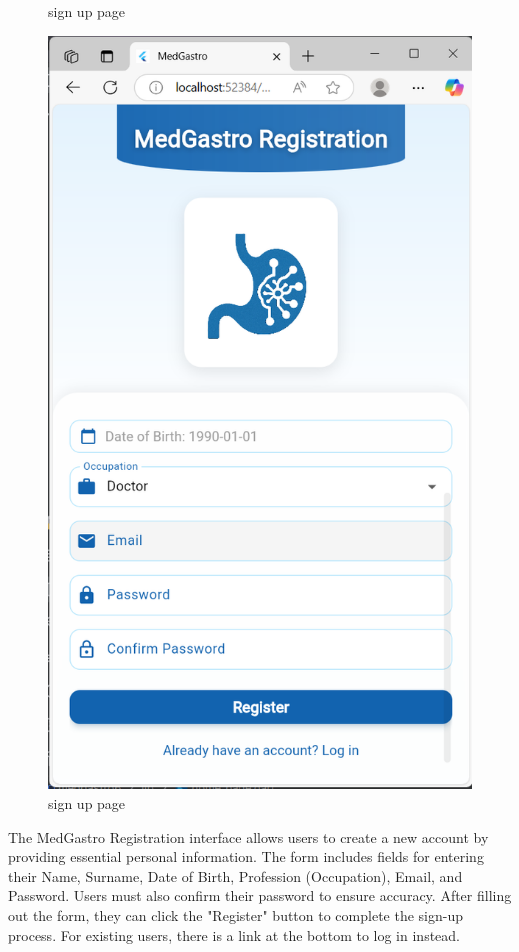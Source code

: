 \documentclass[12pt,a4paper]{report}
\begin{document}
\begin{figure}[H]
\begin{minipage}{0.48\textwidth}
        \caption{sign up page}
        \label{fig:image-a}
    \end{minipage}
    \hfill
    \begin{minipage}{0.48\textwidth}
        \centering
        \includegraphics[width=\linewidth]{i2b.png}
        \caption{sign up page}
        \label{fig:image-b}
    \end{minipage}
\end{figure}

The MedGastro Registration interface allows users to create a new account by providing essential personal information. The form includes fields for entering their Name, Surname, Date of Birth, Profession (Occupation), Email, and Password. Users must also confirm their password to ensure accuracy. After filling out the form, they can click the "Register" button to complete the sign-up process. For existing users, there is a link at the bottom to log in instead.
\end{document}
